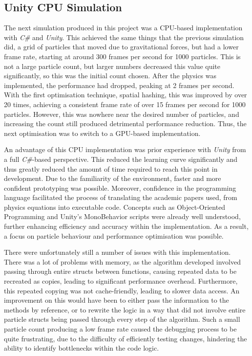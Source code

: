 \documentclass[a4paper, 12pt]{article}
\begin{document}
    \subsection{Unity CPU Simulation}

    The next simulation produced in this project was a CPU-based implementation with \textit{C\#} and \textit{Unity}. This achieved the same things that the previous simulation did, a grid of particles that moved due to gravitational forces, but had a lower frame rate, starting at around 300 frames per second for 1000 particles. This is not a large particle count, but larger numbers decreased this value quite significantly, so this was the initial count chosen. After the physics was implemented, the performance had dropped, peaking at 2 frames per second. With the first optimisation technique, spatial hashing, this was improved by over 20 times, achieving a consistent frame rate of over 15 frames per second for 1000 particles. However, this was nowhere near the desired number of particles, and increasing the count still produced detrimental performance reduction. Thus, the next optimisation was to switch to a GPU-based implementation.

    An advantage of this CPU implementation was prior experience with \textit{Unity} from a full \textit{C\#}-based perspective. This reduced the learning curve significantly and thus greatly reduced the amount of time required to reach this point in development. Due to the familiarity of the environment, faster and more confident prototyping was possible. Moreover, confidence in the programming language facilitated the process of translating the academic papers used, from physics equations into executable code. Concepts such as Object-Oriented Programming and Unity's MonoBehavior scripts were already well understood, further enhancing efficiency and accuracy within the implementation. As a result, a focus on particle behaviour and performance optimisation was possible.

    There were unfortunately still a number of issues with this implementation. There was a lot of problems with memory, as the algorithm developed involved passing through entire structs between functions, causing repeated data to be recreated as copies, leading to significant performance overhead. Furthermore, this repeated copying was not cache-friendly, leading to slower data access. An improvement on this would have been to either pass the information to the methods by reference, or to rewrite the logic in a way that did not involve entire particle structs being passed through every step of the algorithm. Such a small particle count producing a low frame rate caused the debugging process to be quite frustrating, due to the difficulty of efficiently testing changes, hindering the ability to identify bottlenecks within the code logic. 
    
\end{document}

